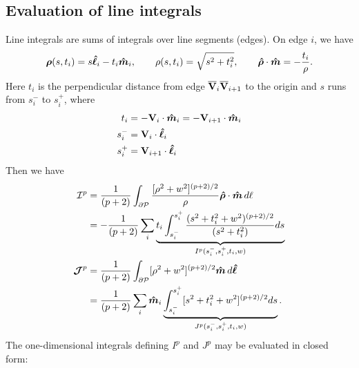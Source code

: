 \documentclass[letterpaper]{article}
\begin{document}
\subsection{Evaluation of line integrals} 

Line integrals are sums of integrals over line segments (edges).
On edge $i$, we have 
$$ \boldsymbol{\rho}(s,t_i)=s\boldsymbol{\hat \ell}_i - t_i\boldsymbol{\hat{m}}_i, 
   \qquad 
   \rho(s,t_i) = \sqrt{s^2 + t_i^2},
   \qquad 
   \boldsymbol{\hat \rho}\cdot \boldsymbol{\hat{m}} = -\frac{t_i}{\rho}.
$$
Here $t_i$ is the perpendicular distance from edge 
$\overline{\mathbf{V}}_{i}\overline{\mathbf{V}}_{i+1}$ to the origin
and $s$ runs from $s_i^-$ to $s_i^+$, where
\begin{align*}
 t_i   &= -\mathbf{V}_i \cdot \boldsymbol{\hat{m}}_i = -\mathbf{V}_{i+1}\cdot \boldsymbol{\hat{m}}_i
\\
 s_i^- &= \mathbf{V}_i \cdot \boldsymbol{\hat \ell}_i
\\
 s_i^+ &= \mathbf{V}_{i+1} \cdot \boldsymbol{\hat \ell}_i
\end{align*}
Then we have
\begin{align*}
 \mathcal{I}^p
&=\frac{1}{(p+2)} \int_{\partial \mathcal{P}} 
   \frac{ [\rho^2 + w^2]^{(p+2)/2} } { \rho }
   \boldsymbol{\hat \rho}\cdot \boldsymbol{\hat{m}}\,d\ell
\\
&=-\frac{1}{(p+2)}
   \sum_i \underbrace{t_i\int_{s_i^-}^{s_i^+} 
                \frac{ (s^2 + t_i^2 + w^2)^{(p+2)/2}}{(s^2 + t_i^2)}ds}
               _{I^p(s_i^-, s_i^+, t_i, w)}
\\
 \boldsymbol{\mathcal{J}}^p
&= \frac{1}{(p+2)}
   \int_{\partial \mathcal{P}} [\rho^2 + w^2]^{(p+2)/2}
   \boldsymbol{\hat{m}} \, d\boldsymbol{\hat \ell}
\\
&= \frac{1}{(p+2)} \sum_i \boldsymbol{\hat{m}}_i 
    \underbrace{ \int_{s_i^-}^{s_i^+} [s^2 + t_i^2 + w^2]^{(p+2)/2}ds}
                 _{J^p(s_i^-, s_i^+, t_i,w)}.
\end{align*}
The one-dimensional integrals defining $I^p$ and $J^p$ may be evaluated
in closed form:
\end{document}
